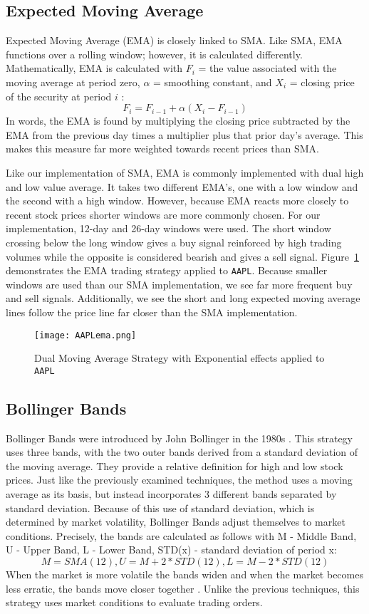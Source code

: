 \documentclass[../thesis.tex]{subfiles}
\begin{document}
\subsection{Expected Moving Average}

Expected Moving Average (EMA) is closely linked to SMA. Like SMA, EMA functions over a rolling window; however, it is calculated differently. Mathematically, EMA is calculated with $F_i$ = the value associated with the moving average at period zero, $\alpha$ = smoothing constant, and $X_i$ = closing price of the security at period $i$ \cite{James1968}:  \[F_i = F_{i-1} +\alpha(X_i - F_{i-1})\]  In words, the EMA is found by multiplying the closing price subtracted by the EMA from the previous day times a multiplier plus that prior day's average. This makes this measure far more weighted towards recent prices than SMA.

Like our implementation of SMA, EMA is commonly implemented with dual high and low value average. It takes two different EMA's, one with a low window and the second with a high window. However, because EMA reacts more closely to recent stock prices shorter windows are more commonly chosen. For our implementation, 12-day and 26-day windows were used. The short window crossing below the long window gives a buy signal reinforced by high trading volumes while the opposite is considered bearish and gives a sell signal. Figure~\ref{EMAfigure} demonstrates the EMA trading strategy applied to \texttt{AAPL}. Because smaller windows are used than our SMA implementation, we see far more frequent buy and sell signals. Additionally, we see the short and long expected moving average lines follow the price line far closer than the SMA implementation.

\begin{figure}[h]
\centering
\texttt{[image: AAPLema.png]}
\caption{Dual Moving Average Strategy with Exponential effects applied to \texttt{AAPL} \label{overflow}}
\label{EMAfigure}
\end{figure}

\subsection{Bollinger Bands}

Bollinger Bands were introduced by John Bollinger in the 1980s \cite{Liu2006}. This strategy uses three bands, with the two outer bands derived from a standard deviation of the moving average. They provide a relative definition for high and low stock prices. Just like the previously examined techniques, the method uses a moving average as its basis, but instead incorporates 3 different bands separated by standard deviation. Because of this use of standard deviation, which is determined by market volatility, Bollinger Bands adjust themselves to market conditions. Precisely, the bands are calculated as follows with M - Middle Band, U - Upper Band, L - Lower Band, STD(x) - standard deviation of period x: \[M = SMA(12), U = M + 2 * STD(12),  L = M - 2 * STD(12)\] When the market is more volatile the bands widen and when the market becomes less erratic, the bands move closer together \cite{Liu2006}. Unlike the previous techniques, this strategy uses market conditions to evaluate trading orders.
\end{document}
